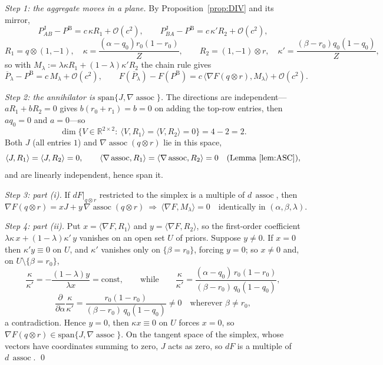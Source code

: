 \documentclass[a4paper,fleqn]{cas-sc}
\theoremstyle{remark}
\theoremstyle{definition}
\newcommand{\PB}{P^{\mathrm{B}}}
\newcommand{\PJ}{P^{\mathrm{J}}}
\newcommand{\Pbar}{\overline{P}}
\newcommand{\assoc}{\operatorname{assoc}}
\newcommand{\bigO}{\mathcal{O}}
\begin{document}
\emph{Step 1: the aggregate moves in a plane.} By Proposition~\ref{prop:DIV} and its mirror,
\[
  \PJ_{AB}-\PB=c\,\kappa R_1+\bigO(c^2),
  \qquad
  \PJ_{BA}-\PB=c\,\kappa' R_2+\bigO(c^2),
\]
\[
  R_1=q\otimes(1,-1),\quad \kappa=\frac{(\alpha-q_0)r_0(1-r_0)}{Z},
  \qquad
  R_2=(1,-1)\otimes r,\quad \kappa'=\frac{(\beta-r_0)q_0(1-q_0)}{Z},
\]
so with $M_\lambda:=\lambda\kappa R_1+(1-\lambda)\kappa' R_2$ the chain rule gives
\[
  \Pbar_\lambda-\PB=c\,M_\lambda+\bigO(c^2),
  \qquad
  F(\Pbar_\lambda)-F(\PB)=c\,\bigl\langle\nabla F(q\otimes r),M_\lambda\bigr\rangle+\bigO(c^2).
\]

\emph{Step 2: the annihilator is $\mathrm{span}\{J,\nabla\assoc\}$.} The directions are
independent---$aR_1+bR_2=0$ gives $b(r_0+r_1)=b=0$ on adding the top-row entries, then $aq_0=0$
and $a=0$---so
\[
  \dim\bigl\{V\in\mathbb{R}^{2\times2}:\ \langle V,R_1\rangle=\langle V,R_2\rangle=0\bigr\}=4-2=2 .
\]
Both $J$ (all entries $1$) and $\nabla\assoc(q\otimes r)$ lie in this space,
\[
  \langle J,R_1\rangle=\langle J,R_2\rangle=0,
  \qquad
  \langle\nabla\assoc,R_1\rangle=\langle\nabla\assoc,R_2\rangle=0
  \quad(\text{Lemma~\ref{lem:ASC}}),
\]
and are linearly independent, hence span it.

\emph{Step 3: part (i).} If $dF|_{q\otimes r}$ restricted to the simplex is a multiple of
$d\,\assoc$, then
\[
  \nabla F(q\otimes r)=xJ+y\,\nabla\assoc(q\otimes r)
  \ \Longrightarrow\
  \bigl\langle\nabla F,M_\lambda\bigr\rangle=0
  \quad\text{identically in }(\alpha,\beta,\lambda).
\]

\emph{Step 4: part (ii).} Put $x=\langle\nabla F,R_1\rangle$ and $y=\langle\nabla F,R_2\rangle$,
so the first-order coefficient $\lambda\kappa\,x+(1-\lambda)\kappa'\,y$ vanishes on an open set
$U$ of priors. Suppose $y\neq0$. If $x=0$ then $\kappa'y\equiv0$ on $U$, and $\kappa'$ vanishes
only on $\{\beta=r_0\}$, forcing $y=0$; so $x\neq0$ and, on $U\setminus\{\beta=r_0\}$,
\[
  \frac{\kappa}{\kappa'}=-\frac{(1-\lambda)y}{\lambda x}=\text{const},
  \qquad\text{while}\qquad
  \frac{\kappa}{\kappa'}=\frac{(\alpha-q_0)\,r_0(1-r_0)}{(\beta-r_0)\,q_0(1-q_0)},
\]
\[
  \frac{\partial}{\partial\alpha}\frac{\kappa}{\kappa'}
   =\frac{r_0(1-r_0)}{(\beta-r_0)\,q_0(1-q_0)}\neq0
  \quad\text{wherever }\beta\neq r_0,
\]
a contradiction. Hence $y=0$, then $\kappa x\equiv0$ on $U$ forces $x=0$, so
$\nabla F(q\otimes r)\in\mathrm{span}\{J,\nabla\assoc\}$. On the tangent space of the simplex,
whose vectors have coordinates summing to zero, $J$ acts as zero, so $dF$ is a multiple of
$d\,\assoc$.
\qed
\end{document}

